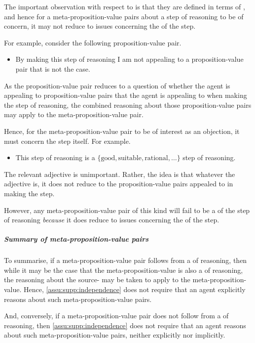 \begin{note}
  The important observation with respect to  is that they are defined in terms of , and hence for a meta-proposition-value pairs about a step of reasoning to be of concern, it may not reduce to issues concerning the  of the step.

  For example, consider the following proposition-value pair.
  \begin{itemize}
  \item By making this step of reasoning I am not appealing to a proposition-value pair that is not the case.
  \end{itemize}
  As the proposition-value pair reduces to a question of whether the agent is appealing to proposition-value pairs that the agent is appealing to when making the step of reasoning, the combined reasoning about those proposition-value pairs may apply to the meta-proposition-value pair.
\end{note}

\begin{note}
  Hence, for the meta-proposition-value pair to be of interest as an objection, it must concern the step itself.
  For example.
  \begin{itemize}
  \item This step of reasoning is a \(\{\text{good},\text{suitable},\text{rational},\dots\}\) step of reasoning.
  \end{itemize}
  The relevant adjective is unimportant.
  Rather, the idea is that whatever the adjective is, it does not reduce to the proposition-value pairs appealed to in making the step.

  However, any meta-proposition-value pair of this kind will fail to be a  of the step of reasoning \emph{because} it does reduce to issues concerning the  of the step.
\end{note}

\subparagraph*{Summary of meta-proposition-value pairs}

\begin{note}
  To summarise, if a meta-proposition-value pair follows from a  of reasoning, then while it may be the case that the meta-proposition-value is also a  of reasoning, the reasoning about the source- may be taken to apply to the meta-proposition-value.
  Hence, \autoref{assu:supp:independence} does not require that an agent explicitly reasons about such meta-proposition-value pairs.

  And, conversely, if a meta-proposition-value pair does not follow from a  of reasoning, then \autoref{assu:supp:independence} does not require that an agent reasons about such meta-proposition-value pairs, neither explicitly nor implicitly.
\end{note}


